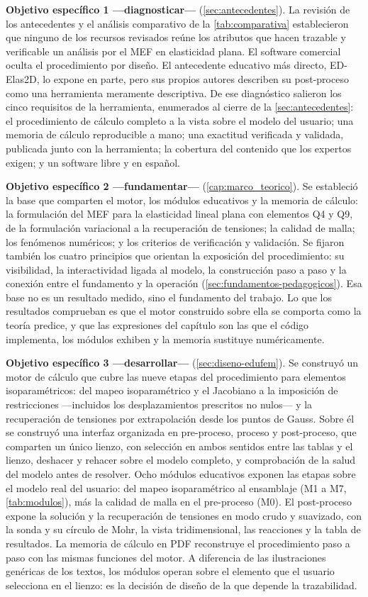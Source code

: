 \textbf{Objetivo específico 1 —diagnosticar—} (\autoref{sec:antecedentes}). La revisión de los antecedentes y el análisis comparativo de la \autoref{tab:comparativa} establecieron que ninguno de los recursos revisados reúne los atributos que hacen trazable y verificable un análisis por el MEF en elasticidad plana. El software comercial oculta el procedimiento por diseño. El antecedente educativo más directo, ED-Elas2D, lo expone en parte, pero sus propios autores describen su post-proceso como una herramienta meramente descriptiva. De ese diagnóstico salieron los cinco requisitos de la herramienta, enumerados al cierre de la \autoref{sec:antecedentes}: el procedimiento de cálculo completo a la vista sobre el modelo del usuario; una memoria de cálculo reproducible a mano; una exactitud verificada y validada, publicada junto con la herramienta; la cobertura del contenido que los expertos exigen; y un software libre y en español.

\textbf{Objetivo específico 2 —fundamentar—} (\autoref{cap:marco_teorico}). Se estableció la base que comparten el motor, los módulos educativos y la memoria de cálculo: la formulación del MEF para la elasticidad lineal plana con elementos Q4 y Q9, de la formulación variacional a la recuperación de tensiones; la calidad de malla; los fenómenos numéricos; y los criterios de verificación y validación. Se fijaron también los cuatro principios que orientan la exposición del procedimiento: su visibilidad, la interactividad ligada al modelo, la construcción paso a paso y la conexión entre el fundamento y la operación (\autoref{sec:fundamentos-pedagogicos}). Esa base no es un resultado medido, sino el fundamento del trabajo. Lo que los resultados comprueban es que el motor construido sobre ella se comporta como la teoría predice, y que las expresiones del capítulo son las que el código implementa, los módulos exhiben y la memoria sustituye numéricamente.

\textbf{Objetivo específico 3 —desarrollar—} (\autoref{sec:diseno-edufem}). Se construyó un motor de cálculo que cubre las nueve etapas del procedimiento para elementos isoparamétricos: del mapeo isoparamétrico y el Jacobiano a la imposición de restricciones —incluidos los desplazamientos prescritos no nulos— y la recuperación de tensiones por extrapolación desde los puntos de Gauss. Sobre él se construyó una interfaz organizada en pre-proceso, proceso y post-proceso, que comparten un único lienzo, con selección en ambos sentidos entre las tablas y el lienzo, deshacer y rehacer sobre el modelo completo, y comprobación de la salud del modelo antes de resolver. Ocho módulos educativos exponen las etapas sobre el modelo real del usuario: del mapeo isoparamétrico al ensamblaje (M1 a M7, \autoref{tab:modulos}), más la calidad de malla en el pre-proceso (M0). El post-proceso expone la solución y la recuperación de tensiones en modo crudo y suavizado, con la sonda y su círculo de Mohr, la vista tridimensional, las reacciones y la tabla de resultados. La memoria de cálculo en PDF reconstruye el procedimiento paso a paso con las mismas funciones del motor. A diferencia de las ilustraciones genéricas de los textos, los módulos operan sobre el elemento que el usuario selecciona en el lienzo: es la decisión de diseño de la que depende la trazabilidad.

